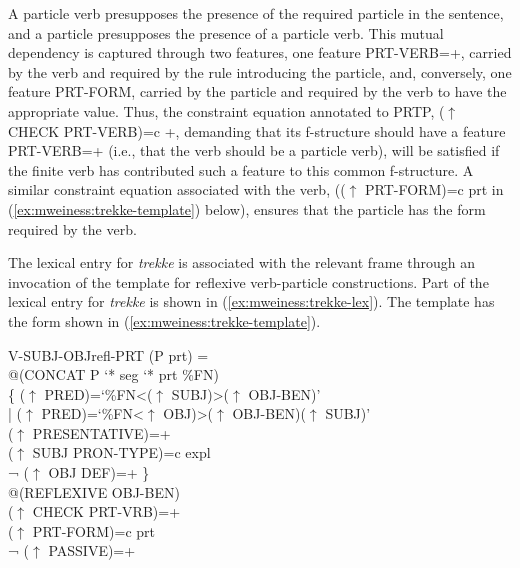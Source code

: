 \documentclass[output=paper]{langsci/langscibook}
\begin{document}
A particle verb presupposes the presence of the required particle in the sentence, and a particle presupposes the presence of a particle verb.
This mutual dependency is captured through two features, one feature PRT-VERB=+, carried by the verb and required by the rule introducing the particle, and, conversely, one feature PRT-FORM, carried by the particle and required by the verb to have the appropriate value.
Thus, the constraint equation annotated to PRTP, ($\uparrow$ CHECK PRT-VERB)=c +, demanding that its f-structure should have a feature PRT-VERB=+ (i.e., that the verb should be a particle verb), will be satisfied if the finite verb has contributed such a feature to this common f-structure.
A similar constraint equation associated with the verb, (($\uparrow$ PRT-FORM)=c prt in (\ref{ex:mweiness:trekke-template}) below), ensures that the particle has the form required by the verb.

The lexical entry for \textit{trekke} is associated with the relevant frame through an invocation of the template for reflexive verb-particle constructions.
Part of the lexical entry for \textit{trekke} is shown in  (\ref{ex:mweiness:trekke-lex}).
The template has the form shown in  (\ref{ex:mweiness:trekke-template}).


\ea\label{ex:mweiness:trekke-template}
{\small 
V-SUBJ-OBJrefl-PRT (P prt) =\\%
\hspace{1.5em} @(CONCAT P `* seg `* prt  \%FN)\\%
\hspace{1.5em}  \{ \enspace ($\uparrow$  PRED)=`\%FN<($\uparrow$ SUBJ)>($\uparrow$ OBJ-BEN)'\\%
\hspace{1.5em} | \enspace ($\uparrow$  PRED)=`\%FN<$\uparrow$ OBJ)>($\uparrow$  OBJ-BEN)($\uparrow$ SUBJ)'\\%
\hspace{1.5em} \quad ($\uparrow$ PRESENTATIVE)=+\\%
\hspace{1.5em} \quad ($\uparrow$ SUBJ PRON-TYPE)=c expl\\%
\hspace{1.5em} \quad ¬ ($\uparrow$ OBJ DEF)=+ \enspace \}\\%
\hspace{1.5em} @(REFLEXIVE OBJ-BEN)\\%
\hspace{1.5em} ($\uparrow$ CHECK PRT-VRB)=+\\%
\hspace{1.5em} ($\uparrow$ PRT-FORM)=c prt\\%
\hspace{1.5em} ¬ ($\uparrow$ PASSIVE)=+
}
\z
\end{document}

